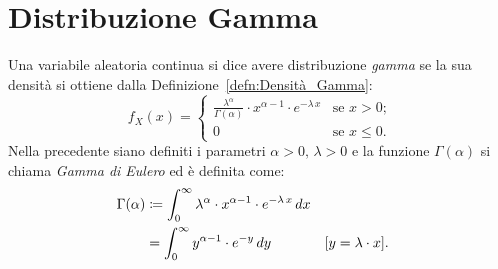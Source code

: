     \section{Distribuzione Gamma}
        \begin{defn}
            Una variabile aleatoria continua si dice avere distribuzione \emph{gamma} se la sua densità si ottiene dalla Definizione~\ref{defn:Densità_Gamma}:
            \begin{equation}\label{eq:Densità_Gamma_Eulero}
                f_{X}(x) = \begin{cases}
                    \frac{\lambda^\alpha}{\Gamma(\alpha)}\cdot x^{\alpha-1}\cdot e^{-\lambda\, x} & \text{se $x > 0$;} \\
                    0 & \text{se $x \leq 0$.}
                \end{cases}
            \end{equation}
            Nella precedente siano definiti i parametri $\alpha > 0,\, \lambda > 0$ e la funzione $\Gamma(\alpha)$ si chiama \emph{Gamma di Eulero} ed è definita come:
            \begin{align}\label{eq:Gamma_di_Eulero}
                \Gamma(\alpha) &\coloneqq \int_{0}^{\infty} \lambda^\alpha \cdot x^{\alpha -1}\cdot e^{-\lambda\, x}\, dx \notag\\
                &= \int_{0}^{\infty} y^{\alpha -1}\cdot e^{-y}\, dy & & [y=\lambda\cdot x]
            .\end{align}
        \end{defn}
